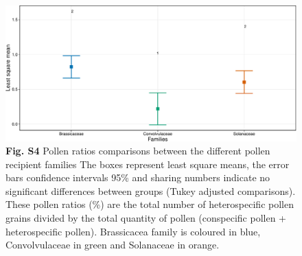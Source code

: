 \documentclass[12pt,]{article}
\begin{document}
\begin{figure}
\centering
\includegraphics{Supp_Material_files/figure-latex/unnamed-chunk-13-1.pdf}
\caption{\textbf{Fig. S4} Pollen ratios comparisons between the
different pollen recipient families The boxes represent least square
means, the error bars confidence intervals 95\% and sharing numbers
indicate no significant differences between groups (Tukey adjusted
comparisons). These pollen ratios (\%) are the total number of
heterospecific pollen grains divided by the total quantity of pollen
(conspecific pollen + heterospecific pollen). Brassicacea family is
coloured in blue, Convolvulaceae in green and Solanaceae in orange.}
\end{figure}

\newpage
\end{document}
